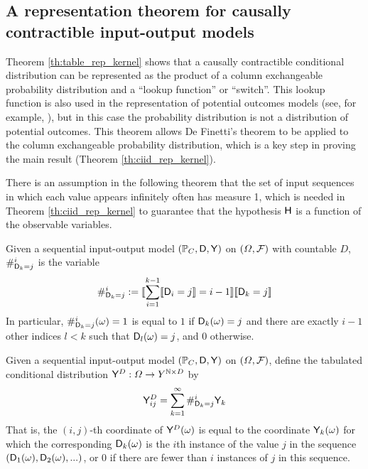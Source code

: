 \subsection[Representation theorem]{A representation theorem for causally contractible input-output models}\label{sec:rep_theorem}

Theorem \ref{th:table_rep_kernel} shows that a causally contractible conditional distribution can be represented as the product of a column exchangeable probability distribution and a ``lookup function'' or ``switch''. This lookup function is also used in the representation of potential outcomes models (see, for example, \citet{rubin_causal_2005}), but in this case the probability distribution is not a distribution of potential outcomes. This theorem allows De Finetti's theorem to be applied to the column exchangeable probability distribution, which is a key step in proving the main result (Theorem \ref{th:ciid_rep_kernel}).

There is an assumption in the following theorem that the set of input sequences in which each value appears infinitely often has measure 1, which is needed in Theorem \ref{th:ciid_rep_kernel} to guarantee that the hypothesis $\mathsf{H}$ is a function of the observable variables.

\begin{definition}
Given a sequential input-output model $(\mathbb{P}_C,\mathsf{D},\mathsf{Y})$ on $(\Omega,\mathcal{F})$ with countable $D$, $\#_{\mathsf{D}_k=j}^i$ is the variable
\begin{align}
    \#_{\mathsf{D}_k=j}^i := \llbracket \sum_{i=1}^{k-1} \llbracket \mathsf{D}_i = j \rrbracket = i-1\rrbracket\llbracket \mathsf{D}_k = j \rrbracket
\end{align}
In particular, $\#_{\mathsf{D}_k=j}^i(\omega)=1$ is equal to $1$ if $\mathsf{D}_k(\omega)=j$ and there are exactly $i-1$ other indices $l<k$ such that $\mathsf{D}_l(\omega)=j$, and 0 otherwise.
\end{definition}

\begin{definition}\label{def:tab_cd}
Given a sequential input-output model $(\mathbb{P}_C,\mathsf{D},\mathsf{Y})$ on $(\Omega,\mathcal{F})$, define the tabulated conditional distribution $\mathsf{Y}^D:\Omega\to Y^{\mathbb{N}\times D}$ by
\begin{align}
    \mathsf{Y}^D_{ij} = \sum_{k=1}^{\infty} \#_{\mathsf{D}_k=j}^i \mathsf{Y}_k
\end{align}
That is, the $(i,j)$-th coordinate of $\mathsf{Y}^D(\omega)$ is equal to the coordinate $\mathsf{Y}_k(\omega)$ for which the corresponding $\mathsf{D}_k(\omega)$ is the $i$th instance of the value $j$ in the sequence $(\mathsf{D}_1(\omega),\mathsf{D}_2(\omega),...)$, or 0 if there are fewer than $i$ instances of $j$ in this sequence.
\end{definition}


